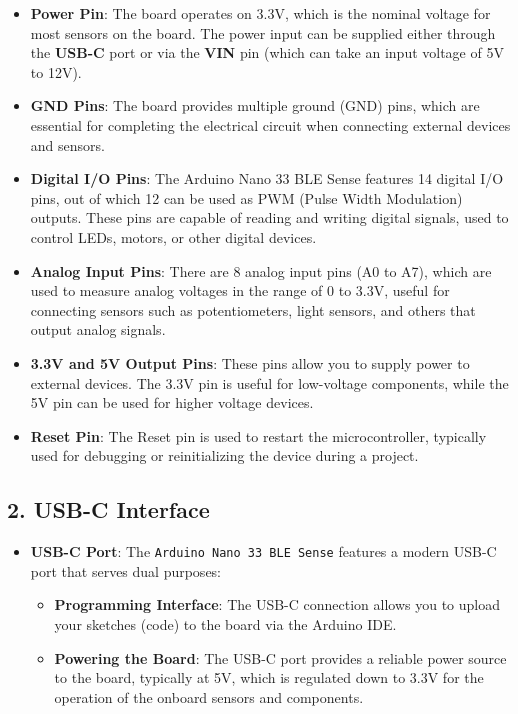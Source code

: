 	\begin{itemize}
		\item \textbf{Power Pin}: The board operates on 3.3V, which is the nominal voltage for most sensors on the board. The power input can be supplied either through the \textbf{USB-C} port or via the \textbf{VIN} pin (which can take an input voltage of 5V to 12V).
		
		\item \textbf{GND Pins}: The board provides multiple ground (GND) pins, which are essential for completing the electrical circuit when connecting external devices and sensors.
		
		\item \textbf{Digital I/O Pins}: The Arduino Nano 33 BLE Sense features 14 digital I/O pins, out of which 12 can be used as PWM (Pulse Width Modulation) outputs. These pins are capable of reading and writing digital signals, used to control LEDs, motors, or other digital devices.
		
		\item \textbf{Analog Input Pins}: There are 8 analog input pins (A0 to A7), which are used to measure analog voltages in the range of 0 to 3.3V, useful for connecting sensors such as potentiometers, light sensors, and others that output analog signals.
		
		\item \textbf{3.3V and 5V Output Pins}: These pins allow you to supply power to external devices. The 3.3V pin is useful for low-voltage components, while the 5V pin can be used for higher voltage devices.
		
		\item \textbf{Reset Pin}: The Reset pin is used to restart the microcontroller, typically used for debugging or reinitializing the device during a project.
	\end{itemize}
	
	\subsection*{2. USB-C Interface}
	\begin{itemize}
		\item \textbf{USB-C Port}: The \texttt{Arduino Nano 33 BLE Sense} features a modern USB-C port that serves dual purposes:
		\begin{itemize}
			\item \textbf{Programming Interface}: The USB-C connection allows you to upload your sketches (code) to the board via the Arduino IDE.
			\item \textbf{Powering the Board}: The USB-C port provides a reliable power source to the board, typically at 5V, which is regulated down to 3.3V for the operation of the onboard sensors and components.
		\end{itemize}
	\end{itemize}
	
